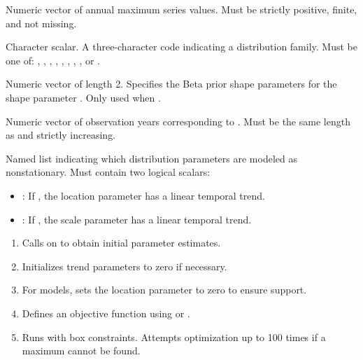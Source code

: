 \documentclass[a4paper]{book}
\begin{document}
\begin{Arguments}
\begin{ldescription}
\item[\code{data}] Numeric vector of annual maximum series values.
Must be strictly positive, finite, and not missing.

\item[\code{distribution}] Character scalar. A three-character code indicating
a distribution family. Must be one of: , , ,
, , , , , or .

\item[\code{prior}] Numeric vector of length 2. Specifies the Beta prior shape
parameters  for the shape parameter \eqn{\kappa}{}.
Only used when .

\item[\code{years}] Numeric vector of observation years corresponding to .
Must be the same length as  and strictly increasing.

\item[\code{structure}] Named list indicating which distribution parameters are
modeled as nonstationary. Must contain two logical scalars:
\begin{itemize}

\item{} : If , the location parameter has a linear temporal trend.
\item{} : If , the scale parameter has a linear temporal trend.

\end{itemize}

\end{ldescription}
\end{Arguments}
%
\begin{Details}
\begin{enumerate}

\item{} Calls  on  to obtain initial parameter estimates.
\item{} Initializes trend parameters to zero if necessary.
\item{} For  models, sets the location parameter to zero to ensure support.
\item{} Defines an objective function using  or .
\item{} Runs  with box constraints. Attempts optimization
up to 100 times if a maximum cannot be found.

\end{enumerate}

\end{Details}
\end{document}
